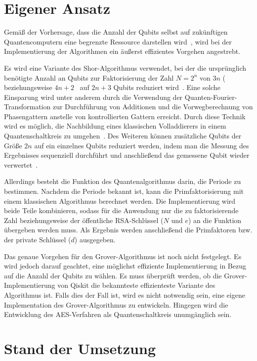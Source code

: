 \documentclass[
  a4paper, %
  10pt, %
  unnumberedsections, %
  twoside, %
]{LTJournalArticle}
\begin{document}
\section{Eigener Ansatz}

Gemäß der Vorhersage, dass die Anzahl der Qubits
selbst auf zukünftigen Quantencomputern eine begrenzte Ressource darstellen wird~\autocite{zalka1998fast},
wird bei der Implementierung der Algorithmen ein äußerst effizientes Vorgehen angestrebt.

Es wird eine Variante des Shor-Algorithmus verwendet,
bei der die ursprünglich benötigte Anzahl an Qubits zur Faktorisierung der Zahl
\(N = 2^{n}\) von \(3n\) (~\autocite{zalka1998fast} beziehungsweise
\(4n+2\)~\autocite{IBM:Shor_docu} auf \(2n+3\) Qubits reduziert wird~\autocite{beauregard2003circuit}.
Eine solche Einsparung wird unter anderem durch
die Verwendung der Quanten-Fourier-Transformation zur Durchführung von Additionen und
die Vorwegberechnung von Phasengattern anstelle von kontrollierten Gattern erreicht.
Durch diese Technik wird es möglich,
die Nachbildung eines klassischen Volladdierers in einem Quantenschaltkreis zu umgehen~\autocite{draper2000addition}.
Des Weiteren können zusätzliche Qubits der Größe \(2n\) auf ein einzelnes Qubits reduziert werden,
indem man die Messung des Ergebnisses sequenziell durchführt und anschließend das gemessene Qubit wieder verwertet~\autocite{Parker_2000}.

Allerdings besteht die Funktion des Quantenalgorithmus darin,
die Periode zu bestimmen.
Nachdem die Periode bekannt ist,
kann die Primfaktorisierung mit einem klassischen Algorithmus berechnet werden.
Die Implementierung wird beide Teile kombinieren,
sodass für die Anwendung nur die zu faktorisierende Zahl beziehungsweise
der öffentliche RSA-Schlüssel (\(N\) und \(e\)) an die Funktion übergeben werden muss.
Als Ergebnis werden anschließend die Primfaktoren bzw. der private Schlüssel (\(d\)) ausgegeben.

Das genaue Vorgehen für den Grover-Algorithmus ist noch nicht festgelegt.
Es wird jedoch darauf geachtet, eine möglichst effiziente Implementierung in Bezug auf die Anzahl der Qubits zu wählen.
Es muss überprüft werden, ob die Grover-Implementierung von Qiskit die bekannteste effizienteste Variante des Algorithmus ist.
Falls dies der Fall ist, wird es nicht notwendig sein,
eine eigene Implementation des Grover-Algorithmus zu entwickeln.
Hingegen wird die Entwicklung des AES-Verfahren als Quantenschaltkreis unumgänglich sein.

\section{\LARGE Stand der Umsetzung}
\end{document}
